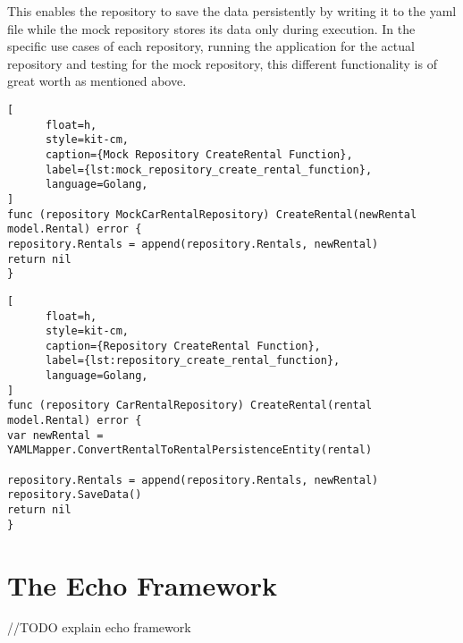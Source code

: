 This enables the repository to save the data persistently by writing it to the yaml file while the mock repository stores its data only during execution.
In the specific use cases of each repository, running the application for the actual repository and testing for the mock repository, this different functionality is of great worth as mentioned above.

\begin{lstlisting}[
      float=h,
      style=kit-cm,
      caption={Mock Repository CreateRental Function},
      label={lst:mock_repository_create_rental_function},
      language=Golang,
]
func (repository MockCarRentalRepository) CreateRental(newRental model.Rental) error {
repository.Rentals = append(repository.Rentals, newRental)
return nil
}
\end{lstlisting}

\begin{lstlisting}[
      float=h,
      style=kit-cm,
      caption={Repository CreateRental Function},
      label={lst:repository_create_rental_function},
      language=Golang,
]
func (repository CarRentalRepository) CreateRental(rental model.Rental) error {
var newRental = YAMLMapper.ConvertRentalToRentalPersistenceEntity(rental)

repository.Rentals = append(repository.Rentals, newRental)
repository.SaveData()
return nil
}
\end{lstlisting}

\section{The Echo Framework}
//TODO explain echo framework